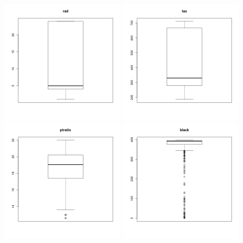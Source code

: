 \documentclass{article}
\begin{document}
\includegraphics[width=2.5in]{9.png}
\includegraphics[width=2.5in]{10.png}
\includegraphics[width=2.5in]{11.png}
\includegraphics[width=2.5in]{12.png}
\end{document}
